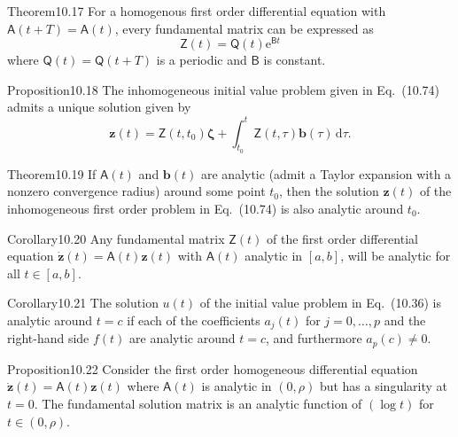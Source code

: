 \begin{res}[Floquet]{Theorem}{10.17}
For a homogenous first order differential equation with $\mathsf A(t+T)=\mathsf A(t)$, every fundamental matrix can be expressed as
\begin{equation}\mathsf Z(t)=\mathsf Q(t)\mathrm e^{\mathsf Bt}\tag{10.70}\end{equation}
where $\mathsf Q(t)=\mathsf Q(t+T)$ is a periodic and $\mathsf B$ is constant.
\end{res}

\begin{res}{Proposition}{10.18}
The inhomogeneous initial value problem given in Eq.~(10.74) admits a unique solution given by
\begin{equation}\boldsymbol z(t)=\mathsf Z(t,t_0)\boldsymbol\zeta+\int_{t_0}^t\mathsf Z(t,\tau)\boldsymbol b(\tau)\,\mathrm d\tau.\tag{10.76}\end{equation}
\end{res}

\begin{res}{Theorem}{10.19}
If $\mathsf A(t)$ and $\boldsymbol b(t)$ are analytic (admit a Taylor expansion with a nonzero convergence radius) around some point $t_0$, then the solution $\boldsymbol z(t)$ of the inhomogeneous first order problem in Eq.~(10.74) is also analytic around $t_0$.
\end{res}

\begin{res}{Corollary}{10.20}
Any fundamental matrix $\mathsf Z(t)$ of the first order differential equation $\dot{\boldsymbol z}(t)=\mathsf A(t)\boldsymbol z(t)$ with $\mathsf A(t)$ analytic in $[a,b]$, will be analytic for all $t\in[a,b]$.
\end{res}

\begin{res}{Corollary}{10.21}
The solution $u(t)$ of the initial value problem in Eq.~(10.36) is analytic around $t=c$ if each of the coefficients $a_j(t)$ for $j=0,\dots,p$ and the right-hand side $f(t)$ are analytic around $t=c$, and furthermore $a_p(c)\ne0$.
\end{res}

\begin{res}{Proposition}{10.22}
Consider the first order homogeneous differential equation $\dot{\boldsymbol z}(t)=\mathsf A(t)\boldsymbol z(t)$ where $\mathsf A(t)$ is analytic in $(0,\rho)$ but has a singularity at $t=0$. The fundamental solution matrix is an analytic function of $(\log t)$ for $t\in(0,\rho)$.
\end{res}

